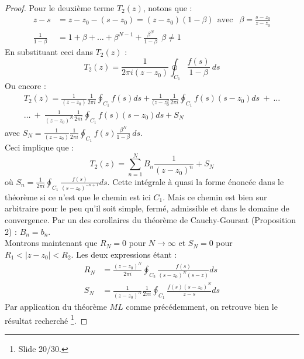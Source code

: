 \begin{proof}
	Pour le deuxième terme $T_2(z)$, notons que :
	\begin{equation}
	\begin{array}{ll}
	z-s &= z-z_0 - (s-z_0) = (z-z_0)(1-\beta)\ \ \text{avec }\ \ \beta = \frac{s-z_0}{z-z_0}\\
	\frac{1}{1-\beta} &= 1+\beta + \dots + \beta^{N-1} + \frac{\beta^N}{1-\beta}\ \ \beta \neq 1
	\end{array}
	\end{equation}
	En substituant ceci dans $T_2(z)$ :
	\begin{equation}
	T_2(z) =  \frac{1}{2\pi i(z-z_0)}\oint_{C_1} \frac{f(s)}{1-\beta}\ ds
	\end{equation}
	Ou encore :
	\begin{multline}
	T_2(z) = \frac{1}{(z-z_0)}\frac{1}{2\pi i}\oint_{C_1} f(s) ds + \frac{1}{(z-z_0^2}\frac{1}{2\pi 
	i}\oint_{C_1} f(s)(s-z_0) ds\ +\ \dots \\
	 \dots\ +\ \frac{1}{(z-z_0)^N}\frac{1}{2\pi i}\oint_{C_1} f(s)(s-	z_0) ds + S_N
	\end{multline}
	avec $S_N = \frac{1}{(z-z_0)}\frac{1}{2\pi i}\oint_{C_1} f(s)\frac{\beta^N}{1-\beta}\ ds$.\\
	Ceci implique que :
	\begin{equation}
	T_2(z) = \sum_{n=1}^N B_n \frac{1}{(z-z_0)^n} + S_N
	\end{equation}
	où $S_n = \frac{1}{2\pi i}\oint_{C_1} \frac{f(s)}{(s-z_0)^{-n+1}} ds$. Cette intégrale à quasi
	la forme énoncée dans le théorème si ce n'est que le chemin est ici $C_1$. Mais ce chemin est
	bien sur arbitraire pour le peu qu'il soit simple, fermé, admissible et dans le domaine de 
	convergence. Par un des corollaires du théorème de Cauchy-Goursat (Proposition 2) : $B_n = 
	b_n$.\\
	
	Montrons maintenant que $R_N = 0$ pour $N \rightarrow \infty$ et $S_N = 0$ pour $R_1<|z-z_0|<
	R_2$. Les deux expressions étant : 
	\begin{equation}
	\begin{array}{ll}
	R_N &= \frac{(z-z_0)^N}{2\pi i}\oint_{C_2} \frac{f(s)}{(s-z_0)^N(s-z)}ds\\
	S_N &=	\frac{1}{(z-z_0)^N}\frac{1}{2\pi i}\oint_{C_1} \frac{f(s)(s-z_0)^N}{z-s}ds
	\end{array}
	\end{equation}
	Par application du théorème $ML$ comme précédemment, on retrouve bien le résultat recherché
	\footnote{Slide 20/30.}.
	\end{proof}

